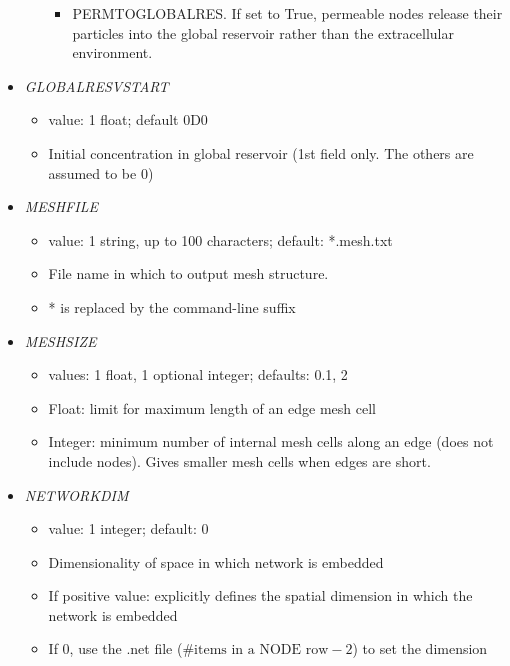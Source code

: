 \documentclass[12pt]{article}
\begin{document}
\begin{itemize}
\begin{itemize}
\begin{itemize}
		\item PERMTOGLOBALRES. If set to True, permeable nodes release their particles into the global reservoir rather than the extracellular environment.
	\end{itemize}
\end{itemize}
%
\item {\it GLOBALRESVSTART}
\begin{itemize}
	\item  value: 1 float; default 0D0
	\item Initial concentration in global reservoir (1st field only. The others are assumed to be 0)
\end{itemize}
%
\item {\it MESHFILE}
\begin{itemize}
	\item  value: 1 string, up to 100 characters; default: *.mesh.txt
	\item File name in which to output mesh structure.
	\item * is replaced by the command-line suffix
\end{itemize}
%
\item {\it MESHSIZE}
\begin{itemize}
	\item  values: 1 float, 1 optional integer; defaults: 0.1, 2
	\item Float: limit for maximum length of an edge mesh cell
	\item Integer: minimum number of internal mesh cells along an edge (does not include nodes). Gives smaller mesh cells when edges are short.
\end{itemize}
%
\item {\it NETWORKDIM}
	\begin{itemize}
		\item  value: 1 integer; default: 0
		\item Dimensionality of space in which network is embedded
		\item If positive value: explicitly defines the spatial dimension in which the network is embedded
		\item If 0, use the .net file ($\text{\# items in a NODE row} - 2$) to set the dimension
	\end{itemize}

\end{itemize}
\end{document}

